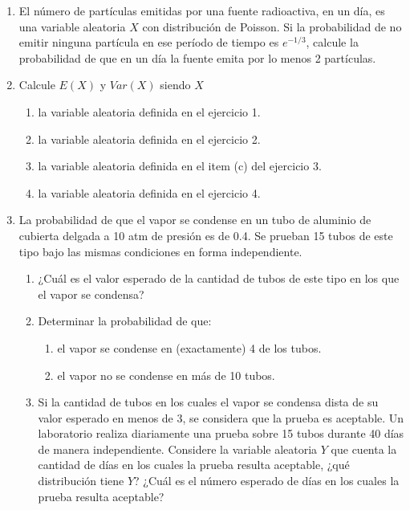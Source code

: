 \documentclass[a4paper, 11pt]{article}
\begin{document}
\begin{enumerate}
    \item El número de partículas emitidas por una fuente radioactiva, en un día, es una variable aleatoria $X$ con distribución de Poisson. Si la probabilidad de no emitir ninguna partícula en ese período de tiempo es $e^{-1/3}$, calcule la probabilidad de que en un día la fuente emita por lo menos 2 partículas.
    
    \item Calcule $E(X)$ y $Var(X)$ siendo $X$
    \begin{enumerate}
        \item la variable aleatoria definida en el ejercicio 1.
        \item la variable aleatoria definida en el ejercicio 2.
        \item la variable aleatoria definida en el item (c) del ejercicio 3.
        \item la variable aleatoria definida en el ejercicio 4.
    \end{enumerate}
    
    \item La probabilidad de que el vapor se condense en un tubo de aluminio de cubierta delgada a 10 atm de presión es de 0.4. Se prueban 15 tubos de este tipo bajo las mismas condiciones en forma independiente.
    \begin{enumerate}
        \item ¿Cuál es el valor esperado de la cantidad de tubos de este tipo en los que el vapor se condensa?
        \item Determinar la probabilidad de que:
        \begin{enumerate}
            \item el vapor se condense en (exactamente) 4 de los tubos.
            \item el vapor no se condense en más de 10 tubos.
        \end{enumerate}
        \item Si la cantidad de tubos en los cuales el vapor se condensa dista de su valor esperado en menos de 3, se considera que la prueba es aceptable. Un laboratorio realiza diariamente una prueba sobre 15 tubos durante 40 días de manera independiente. Considere la variable aleatoria $Y$ que cuenta la cantidad de días en los cuales la prueba resulta aceptable, ¿qué distribución tiene $Y$? ¿Cuál es el número esperado de días en los cuales la prueba resulta aceptable?
    \end{enumerate}
    

\end{enumerate}
\end{document}
